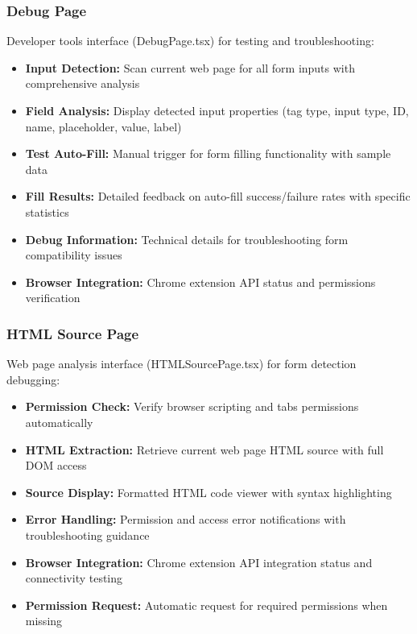 \documentclass[11pt, a4paper]{article}
\theoremstyle{plain}
\theoremstyle{definition}
\begin{document}
\subsubsection{Debug Page}

Developer tools interface (DebugPage.tsx) for testing and troubleshooting:

\begin{itemize}
    \item \textbf{Input Detection:} Scan current web page for all form inputs with comprehensive analysis
    \item \textbf{Field Analysis:} Display detected input properties (tag type, input type, ID, name, placeholder, value, label)
    \item \textbf{Test Auto-Fill:} Manual trigger for form filling functionality with sample data
    \item \textbf{Fill Results:} Detailed feedback on auto-fill success/failure rates with specific statistics
    \item \textbf{Debug Information:} Technical details for troubleshooting form compatibility issues
    \item \textbf{Browser Integration:} Chrome extension API status and permissions verification
\end{itemize}

\subsubsection{HTML Source Page}

Web page analysis interface (HTMLSourcePage.tsx) for form detection debugging:

\begin{itemize}
    \item \textbf{Permission Check:} Verify browser scripting and tabs permissions automatically
    \item \textbf{HTML Extraction:} Retrieve current web page HTML source with full DOM access
    \item \textbf{Source Display:} Formatted HTML code viewer with syntax highlighting
    \item \textbf{Error Handling:} Permission and access error notifications with troubleshooting guidance
    \item \textbf{Browser Integration:} Chrome extension API integration status and connectivity testing
    \item \textbf{Permission Request:} Automatic request for required permissions when missing
\end{itemize}
\end{document}
